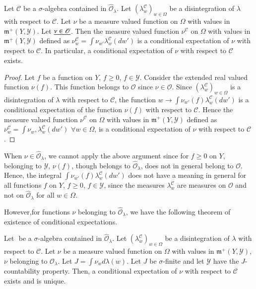 \begin{thm}\label{part1:chap3:thm45}
Let $\mathscr{C}$ be a $\sigma$-algebra contained in
$\hat{\mathscr{O}}_\lambda$. Let $(\lambda^\mathscr{C}_w)_{w
  \in\Omega}$ be a disintegration of $\lambda$ with respect to
$\mathscr{C}$. Let $\nu$ be a measure valued function on $\Omega$ with
values in $\mathfrak{m}^+ (Y, \mathscr{Y} )$. Let $\underline{\nu \in
  \mathscr{O}}$. Then the measure valued function $\nu^\mathscr{C}$ on
$\Omega$ with values in $\mathfrak{m}^+ (Y, \mathscr{Y})$ defined as
$\nu^\mathscr{C}_w = \int \nu_{w'} \lambda^\mathscr{C}_w(dw')$  is a
conditional expectation of $\nu$ with respect to $\mathscr{C}$. In
particular, a conditional expectation of $\nu$ with respect to
$\mathscr{C}$ exists. 
\end{thm}

\begin{proof}
Let $f$ be a function on $Y$, $f \geq 0$, $f \in \mathscr{Y}$. Consider the  extended real valued function
$\nu(f)$. This function belongs to $\mathscr{O}$ since $\nu \in
\mathscr{O}$. Since $(\lambda^\mathscr{C}_w)_{w \in \Omega}$ is a
disintegration of $\lambda$ with respect to $\mathscr{C}$, the
function $w \to \int \nu_{w'} (f) \lambda^\mathscr{C}_w(dw')$ is a
conditional expectation of the function $\nu(f)$ with respect to
$\mathscr{C}$. Hence the measure valued function $\nu^\mathscr{C}$ on
$\Omega$  with values in $\mathfrak{m}^+ (Y, \mathscr{Y})$ defined as
$\nu^\mathscr{C}_w = \int \nu_w, \lambda^\mathscr{C}_w(dw')$  $\forall
w \in\Omega$, is a conditional expectation of $\nu$ with respect to
$\mathscr{C}$. 
\end{proof}

When $\nu \in \hat{\mathscr{O}}_\lambda$, we cannot apply the above
argument since for $f \geq 0$ on $Y$, belonging to $\mathscr{Y}$,
$\nu(f)$, though belongs to $\hat{\mathscr{O}}_\lambda$, does not in
general belong to $\mathscr{O}$. Hence, the integral $\int \nu_{w'} (f)
\lambda^\mathscr{C}_w(dw')$ does not have a meaning in general for all
functions $f$ on $Y$, $f\geq 0$, $f \in \mathscr{Y}$, since the
measures $\lambda^\mathscr{C}_w$ are measures on $\mathscr{O}$ and not
on $\hat{\mathscr{O}}_\lambda$ for all $w \in \Omega$. 


However,\pageoriginale for functions $\nu$ belonging to
$\hat{\mathscr{O}}_\lambda$, we have the following theorem of
existence of conditional expectations. 

\begin{thm}\label{part1:chap3:thm46}
Let $\mathscr{}$ be a $\sigma$-algebra contained in
$\hat{\mathscr{O}}_\lambda$. Let $(\lambda^\mathscr{C}_w)_{w
  \in\Omega}$ be a disintegration of $\lambda$ with respect to
$\mathscr{C}$. Let $\nu$ be a measure valued function on $\Omega$ with
values in $\mathfrak{m}^+ (Y, \mathscr{Y})$, $\nu$ belonging to
$\hat{\mathscr{O}}_\lambda$. Let $J = \int \nu_w d \lambda(w)$. Let
$J$ be $\sigma$-finite and let $\mathscr{Y}$ have the $J$-countability
property. Then, a conditional expectation of $\nu$ with respect to
$\mathscr{C}$ exists and is unique.
\end{thm}

